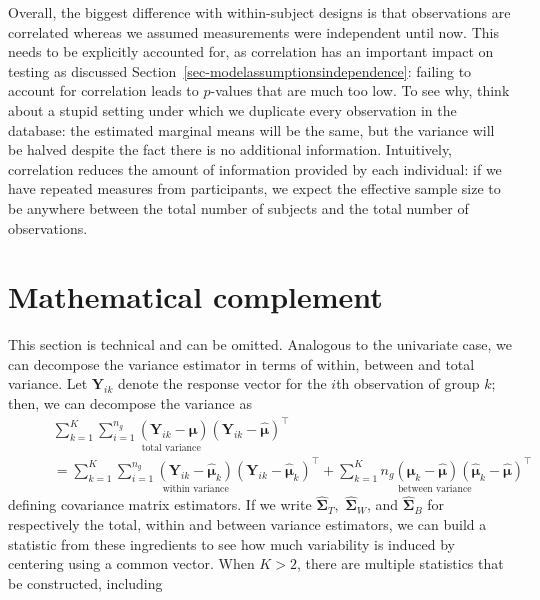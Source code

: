 \documentclass[
  11pt,
  letterpaper,
]{scrbook}
\theoremstyle{definition}
\theoremstyle{definition}
\theoremstyle{remark}
\begin{document}
Overall, the biggest difference with within-subject designs is that
observations are correlated whereas we assumed measurements were
independent until now. This needs to be explicitly accounted for, as
correlation has an important impact on testing as discussed
Section~\ref{sec-modelassumptionsindependence}: failing to account for
correlation leads to \(p\)-values that are much too low. To see why,
think about a stupid setting under which we duplicate every observation
in the database: the estimated marginal means will be the same, but the
variance will be halved despite the fact there is no additional
information. Intuitively, correlation reduces the amount of information
provided by each individual: if we have repeated measures from
participants, we expect the effective sample size to be anywhere between
the total number of subjects and the total number of observations.

\section{Mathematical complement}\label{mathematical-complement}

This section is technical and can be omitted. Analogous to the
univariate case, we can decompose the variance estimator in terms of
within, between and total variance. Let \(\boldsymbol{Y}_{ik}\) denote
the response vector for the \(i\)th observation of group \(k\); then, we
can decompose the variance as \begin{align*} &
\underset{\text{total variance}}{\sum_{k=1}^K \sum_{i=1}^{n_g} (\boldsymbol{Y}_{ik} - \widehat{\boldsymbol{\mu}})(\boldsymbol{Y}_{ik} - \widehat{\boldsymbol{\mu}})^\top} \\\qquad &= \underset{\text{within variance}}{\sum_{k=1}^K \sum_{i=1}^{n_g} (\boldsymbol{Y}_{ik} - \widehat{\boldsymbol{\mu}}_k)(\boldsymbol{Y}_{ik} - \widehat{\boldsymbol{\mu}}_k)^\top} + \underset{\text{between variance}}{\sum_{k=1}^K n_g(\boldsymbol{\mu}_{k} - \widehat{\boldsymbol{\mu}})(\widehat{\boldsymbol{\mu}}_k - \widehat{\boldsymbol{\mu}})^\top}
\end{align*} defining covariance matrix estimators. If we write
\(\widehat{\boldsymbol{\Sigma}}_T,\)
\(\widehat{\boldsymbol{\Sigma}}_W\), and
\(\widehat{\boldsymbol{\Sigma}}_B\) for respectively the total, within
and between variance estimators, we can build a statistic from these
ingredients to see how much variability is induced by centering using a
common vector. When \(K>2\), there are multiple statistics that be
constructed, including
\end{document}
